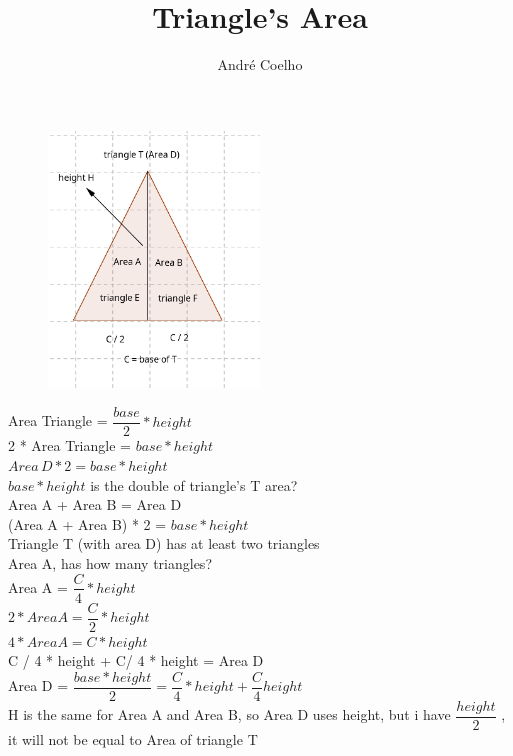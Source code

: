 \documentclass[14pt]{extarticle}
\title{Triangle's Area}
\author{André Coelho}
\begin{document}
\maketitle





\begin{figure}[h]
\centering
  \includegraphics[width=0.5\textwidth]{triangle_area}
\end{figure}
 
 \begin{center}



Area Triangle = $ \dfrac{base}{2} * height $ \\[1cm]


2 * Area Triangle = $  base * height $ \\[1cm]
$Area\, D * 2 = base * height $ \\[1cm]
$base * height $ is the double of triangle's T area? \\[1cm]
Area A + Area B = Area D \\[1cm]
(Area A + Area B) * 2 = $ base * height $  \\[1cm]

Triangle T (with area D) has at least two triangles  \\[1cm]

Area A, has how many triangles?  \\[1cm]

Area A = $ \dfrac{C}{4} * height $  \\[1cm]

$ 2 * Area A = \dfrac{C}{2}  * height $  \\[1cm]

$ 4 * Area A = C * height $  \\[1cm]

C / 4 * height + C/ 4 * height = Area D  \\[1cm]

Area D = $ \dfrac{base * height}{2} = \dfrac{C}{4}  * height + \dfrac{C}{4} height $  \\[1cm]

H is the same for Area A and Area B, so Area D uses height,  but i have \( \dfrac{height}{2} \) , it will not be equal to Area of triangle T  \\[1cm]

\end{center}
\end{document}
